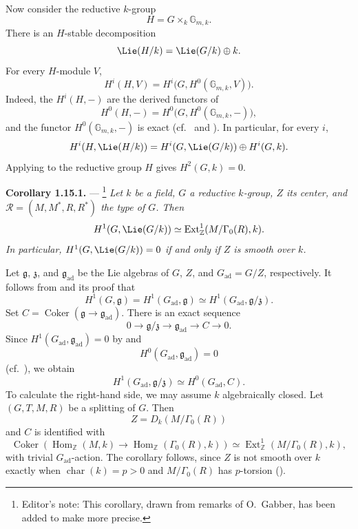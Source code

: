 
Now consider the reductive \(k\)-group
\[
  H=G\times_k\mathbb G_{m,k}.
\]
There is an \(H\)-stable decomposition
\[
  \Lie(H/k)=\Lie(G/k)\oplus k.
\]
For every \(H\)-module \(V\),
\[
  H^i(H,V)=H^i\bigl(G,H^0(\mathbb G_{m,k},V)\bigr).
\]
Indeed, the \(H^i(H,-)\) are the derived functors of
\[
  H^0(H,-)
  =H^0\bigl(G,H^0(\mathbb G_{m,k},-)\bigr),
\]
and the functor \(H^0(\mathbb G_{m,k},-)\) is exact
(cf.\  and ). In particular, for every \(i\),
\[
  H^i(H,\Lie(H/k))
  =
  H^i(G,\Lie(G/k))\oplus H^i(G,k).
\]
Applying  to the reductive group \(H\) gives
\(H^2(G,k)=0\).

\medskip\noindent\textbf{Corollary 1.15.1.} ---
\footnote{Editor's note: This corollary, drawn from remarks of
O.~Gabber, has been added to make  more precise.}
{\itshape Let \(k\) be a field, \(G\) a reductive \(k\)-group, \(Z\)
its center, and \(\mathscr R=(M,M^*,R,R^*)\) the type of \(G\). Then
\[
  H^1(G,\Lie(G/k))
  \simeq
  \operatorname{Ext}^1_{\mathbb Z}(M/\Gamma_0(R),k).
\]
In particular, \(H^1(G,\Lie(G/k))=0\) if and only if \(Z\) is smooth
over \(k\).}

Let \(\mathfrak g\), \(\mathfrak z\), and
\(\mathfrak g_{\mathrm{ad}}\) be the Lie algebras of \(G\), \(Z\), and
\(G_{\mathrm{ad}}=G/Z\), respectively. It follows from  and its
proof that
\[
  H^1(G,\mathfrak g)
  =
  H^1(G_{\mathrm{ad}},\mathfrak g)
  \simeq
  H^1(G_{\mathrm{ad}},\mathfrak g/\mathfrak z).
\]
Set \(C=\operatorname{Coker}(\mathfrak g\to
\mathfrak g_{\mathrm{ad}})\). There is an exact sequence
\[
  0\longrightarrow\mathfrak g/\mathfrak z
  \longrightarrow\mathfrak g_{\mathrm{ad}}
  \longrightarrow C\longrightarrow0.
\]
Since \(H^1(G_{\mathrm{ad}},\mathfrak g_{\mathrm{ad}})=0\) by 
and
\[
  H^0(G_{\mathrm{ad}},\mathfrak g_{\mathrm{ad}})=0
\]
(cf.\ ), we obtain
\[
  H^1(G_{\mathrm{ad}},\mathfrak g/\mathfrak z)
  \simeq H^0(G_{\mathrm{ad}},C).
\]
To calculate the right-hand side, we may assume \(k\) algebraically
closed. Let \((G,T,M,R)\) be a splitting of \(G\). Then
\[
  Z=D_k(M/\Gamma_0(R))
\]
and \(C\) is identified with
\[
  \operatorname{Coker}\!\left(
    \operatorname{Hom}_{\mathbb Z}(M,k)
    \longrightarrow
    \operatorname{Hom}_{\mathbb Z}(\Gamma_0(R),k)
  \right)
  \simeq
  \operatorname{Ext}^1_{\mathbb Z}(M/\Gamma_0(R),k),
\]
with trivial \(G_{\mathrm{ad}}\)-action. The corollary follows, since
\(Z\) is not smooth over \(k\) exactly when
\(\operatorname{char}(k)=p>0\) and \(M/\Gamma_0(R)\) has
\(p\)-torsion ().


